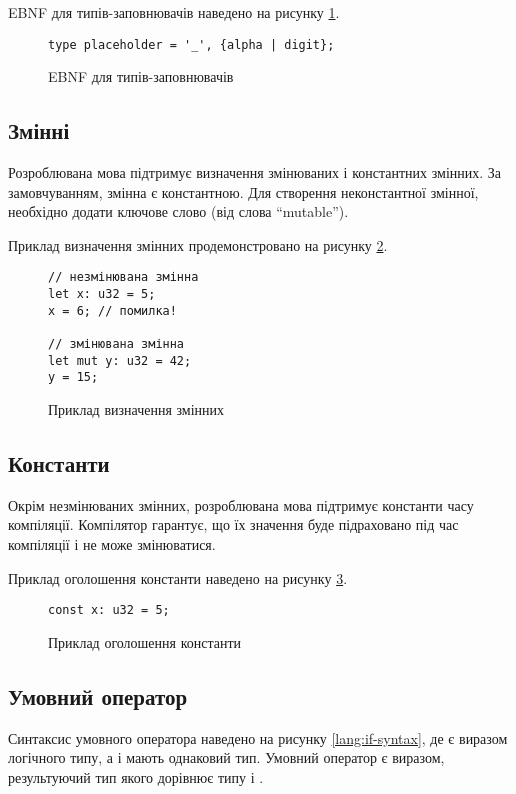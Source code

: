 \documentclass[main.tex]{subfiles}
\begin{document}
EBNF для типів-заповнювачів наведено на рисунку \ref{ebnf:type-placeholder}.

\begin{figure}[h]
  \centering
  \begin{verbatim}
type placeholder = '_', {alpha | digit};
  \end{verbatim}
  \caption{EBNF для типів-заповнювачів}
  \label{ebnf:type-placeholder}
\end{figure}

\FloatBarrier
\subsection{Змінні}
Розроблювана мова підтримує визначення змінюваних і константних змінних.
За замовчуванням, змінна є константною.
Для створення неконстантної змінної, необхідно додати ключове слово  (від слова ``mutable'').

Приклад визначення змінних продемонстровано на рисунку \ref{lang:variables}.

\begin{figure}[h]
  \centering
  \begin{verbatim}
// незмінювана змінна
let x: u32 = 5;
x = 6; // помилка!

// змінювана змінна
let mut y: u32 = 42;
y = 15;
  \end{verbatim}
  \caption{Приклад визначення змінних}
  \label{lang:variables}
\end{figure}

\FloatBarrier
\subsection{Константи}
Окрім незмінюваних змінних, розроблювана мова підтримує константи часу компіляції.
Компілятор гарантує, що їх значення буде підраховано під час компіляції і не може змінюватися.

Приклад оголошення константи наведено на рисунку \ref{lang:const}.

\begin{figure}[h]
  \centering
  \begin{verbatim}
const x: u32 = 5;
  \end{verbatim}
  \caption{Приклад оголошення константи}
  \label{lang:const}
\end{figure}

\FloatBarrier
\subsection{Умовний оператор}
Синтаксис умовного оператора наведено на рисунку \ref{lang:if-syntax}, де  є виразом логічного типу, а  і  мають однаковий тип.
Умовний оператор є виразом, результуючий тип якого дорівнює типу  і .
\end{document}
